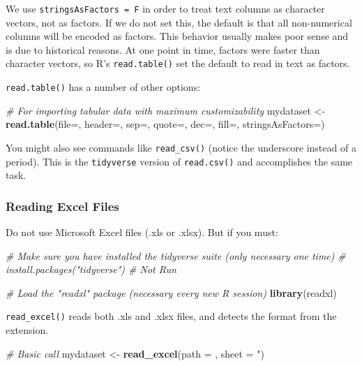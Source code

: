 \documentclass[]{book}
\newenvironment{Shaded}{\begin{snugshade}}{\end{snugshade}}
\newcommand{\KeywordTok}[1]{\textcolor[rgb]{0.13,0.29,0.53}{\textbf{#1}}}
\newcommand{\DataTypeTok}[1]{\textcolor[rgb]{0.13,0.29,0.53}{#1}}
\newcommand{\StringTok}[1]{\textcolor[rgb]{0.31,0.60,0.02}{#1}}
\newcommand{\CommentTok}[1]{\textcolor[rgb]{0.56,0.35,0.01}{\textit{#1}}}
\newcommand{\NormalTok}[1]{#1}
\begin{document}
We use \texttt{stringsAsFactors\ =\ F} in order to treat text columns as
character vectors, not as factors. If we do not set this, the default is
that all non-numerical columns will be encoded as factors. This behavior
usually makes poor sense and is due to historical reasons. At one point
in time, factors were faster than character vectors, so R's
\texttt{read.table()} set the default to read in text as factors.

\texttt{read.table()} has a number of other options:

\begin{Shaded}
\begin{Highlighting}[]
\CommentTok{# For importing tabular data with maximum customizability}
\NormalTok{mydataset <-}\StringTok{ }\KeywordTok{read.table}\NormalTok{(}\DataTypeTok{file=}\NormalTok{, }\DataTypeTok{header=}\NormalTok{, }\DataTypeTok{sep=}\NormalTok{, }\DataTypeTok{quote=}\NormalTok{, }\DataTypeTok{dec=}\NormalTok{, }\DataTypeTok{fill=}\NormalTok{, }\DataTypeTok{stringsAsFactors=}\NormalTok{)}
\end{Highlighting}
\end{Shaded}

You might also see commands like \texttt{read\_csv()} (notice the
underscore instead of a period). This is the \texttt{tidyverse} version
of \texttt{read.csv()} and accomplishes the same task.

\subsubsection*{Reading Excel Files}\label{reading-excel-files}

Do not use Microsoft Excel files (.xls or .xlsx). But if you must:

\begin{Shaded}
\begin{Highlighting}[]
\CommentTok{# Make sure you have installed the tidyverse suite (only necessary one time)}
\CommentTok{# install.packages("tidyverse") # Not Run}

\CommentTok{# Load the "readxl" package (necessary every new R session)}
\KeywordTok{library}\NormalTok{(readxl)}
\end{Highlighting}
\end{Shaded}

\texttt{read\_excel()} reads both .xls and .xlsx files, and detects the
format from the extension.

\begin{Shaded}
\begin{Highlighting}[]
\CommentTok{# Basic call}
\NormalTok{mydataset <-}\StringTok{ }\KeywordTok{read_excel}\NormalTok{(}\DataTypeTok{path =}\NormalTok{ , }\DataTypeTok{sheet =} \StringTok{")}
\end{Highlighting}
\end{Shaded}
\end{document}
